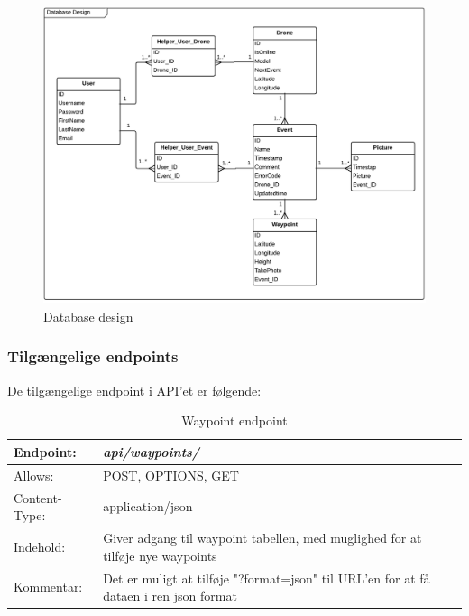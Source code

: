 \begin{figure}[H]
	\centering
	\includegraphics[width=1\textwidth]{Billeder/database/database_design.png}
	\vspace{-.5cm}
	\caption{Database design}
	\label{fig:database_design}
\end{figure}

\vspace{0.5cm}

\subsubsection*{Tilgængelige endpoints}
De tilgængelige endpoint i API'et er følgende:

\begin{table}[H]
\begin{tabular}{| p{3cm}| p{11.5cm}|}
\hline
Endpoint:	 							& \textbf{\textit{api/waypoints/}}\\\hline
Allows:									& POST, OPTIONS, GET\\\hline
Content-Type:						& application/json\\\hline 
Indehold:								& Giver adgang til waypoint tabellen, med muglighed for at tilføje nye waypoints\\\hline 
Kommentar:							& Det er muligt at tilføje "?format=json" til URL'en for at få dataen i ren json format\\\hline
\end{tabular}
\caption{Waypoint endpoint}
\label{waypoint_endpoint}
\end{table}

